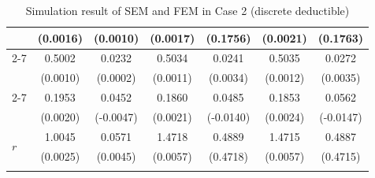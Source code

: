 \documentclass[11pt]{article}
\begin{document}
\begin{table}[!ht]
{{\begin{minipage}{0.65\textwidth}
\begin{tabular}{lcccccc}
         & (0.0016) & (0.0010) & (0.0017) & (0.1756) & (0.0021) & (0.1763) \\
        \cmidrule{2-7}
         & 0.5002 & 0.0232 & 0.5034 & 0.0241 & 0.5035 & 0.0272 \\
         & (0.0010) & (0.0002) & (0.0011) & (0.0034) & (0.0012) & (0.0035) \\
        \cmidrule{2-7}
         & 0.1953 & 0.0452 & 0.1860 & 0.0485 & 0.1853 & 0.0562 \\
         & (0.0020) & (-0.0047) & (0.0021) & (-0.0140) & (0.0024) & (-0.0147) \\
        \midrule
        \multirow{2}{*}{$r$} & 1.0045 & 0.0571 & 1.4718 & 0.4889 & 1.4715 & 0.4887 \\
         & (0.0025) & (0.0045) & (0.0057) & (0.4718) & (0.0057) & (0.4715) \\
        \hhline{=======}
        \end{tabular}
    \end{minipage}
}
}
\caption{Simulation result of SEM and FEM in Case 2 (discrete deductible)}\label{tab:AppSimExoCase2}
\end{table}
\end{document}
